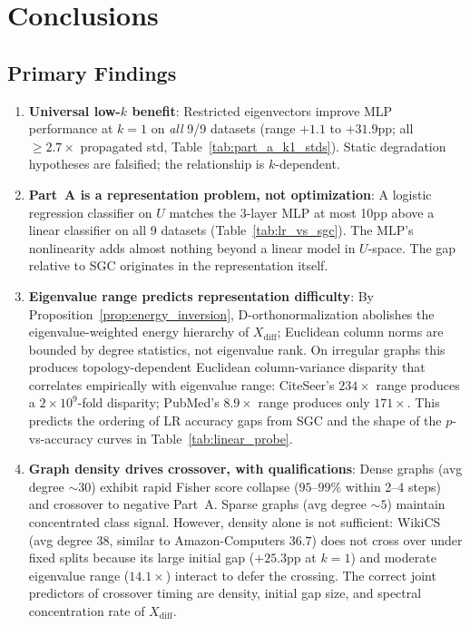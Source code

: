 \documentclass[11pt]{article}
\begin{document}
\section{Conclusions}
\label{sec:conclusions}

\subsection{Primary Findings}

\begin{enumerate}
  \item \textbf{Universal low-$k$ benefit}: Restricted eigenvectors improve MLP
    performance at $k{=}1$ on \emph{all} 9/9 datasets (range $+1.1$ to $+31.9$pp;
    all ${\geq}2.7\times$ propagated std, Table~\ref{tab:part_a_k1_stds}).
    Static degradation hypotheses are falsified; the relationship is $k$-dependent.

  \item \textbf{Part~A is a representation problem, not optimization}: A logistic
    regression classifier on $U$ matches the 3-layer MLP at most 10pp above a linear classifier on all
    9 datasets (Table~\ref{tab:lr_vs_sgc}).  The MLP's nonlinearity adds almost
    nothing beyond a linear model in $U$-space.  The gap relative to SGC originates
    in the representation itself.

  \item \textbf{Eigenvalue range predicts representation difficulty}: By
    Proposition~\ref{prop:energy_inversion}, D-orthonormalization abolishes the
    eigenvalue-weighted energy hierarchy of $X_{\mathrm{diff}}$; Euclidean column
    norms are bounded by degree statistics, not eigenvalue rank.
    On irregular graphs this produces topology-dependent Euclidean column-variance
    disparity that correlates empirically with eigenvalue range:
    CiteSeer's $234\times$ range produces a $2{\times}10^9$-fold disparity;
    PubMed's $8.9\times$ range produces only $171\times$.
    This predicts the ordering of LR accuracy gaps from SGC and the shape of
    the $p$-vs-accuracy curves in Table~\ref{tab:linear_probe}.

  \item \textbf{Graph density drives crossover, with qualifications}: Dense graphs
    (avg degree ${\sim}30$) exhibit rapid Fisher score collapse ($95$--$99\%$ within
    2--4 steps) and crossover to negative Part~A.  Sparse graphs (avg degree ${\sim}5$)
    maintain concentrated class signal.  However, density alone is not sufficient:
    WikiCS (avg degree $38$, similar to Amazon-Computers $36.7$) does not cross over
    under fixed splits because its large initial gap ($+25.3$pp at $k{=}1$) and
    moderate eigenvalue range ($14.1\times$) interact to defer the crossing.  The
    correct joint predictors of crossover timing are density, initial gap size, and
    spectral concentration rate of $X_{\mathrm{diff}}$.


\end{enumerate}
\end{document}
